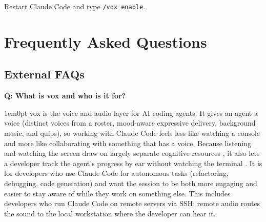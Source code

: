 \documentclass[11pt,letterpaper]{article}
\newcounter{faqnum}
\newenvironment{faqpair}[1]{%
  \needspace{4\baselineskip}%
  \vspace{0.5em}%
  \refstepcounter{faqnum}%
  \noindent\textbf{\color{SectionBlue}Q\thefaqnum: #1}\par\nopagebreak[4]%
  \vspace{0.2em}%
  \begin{adjustwidth}{1em}{0pt}%
  \setlength{\parindent}{0pt}%
}{%
  \end{adjustwidth}%
  \vspace{0.5em}%
}
\begin{document}
Restart Claude Code and type \texttt{/vox enable}.

\newpage


\section*{Frequently Asked Questions}


\subsection*{External FAQs}

\begin{faqpair}{What is vox and who is it for?}\label{faq:what}
  vox is the voice and audio layer for AI coding agents. It gives an
  agent a voice (distinct voices from a roster, mood-aware expressive
  delivery, background music, and quips), so working with Claude Code feels
  less like watching a console and more like collaborating with something that
  has a voice. Because listening and watching the screen draw on largely
  separate cognitive resources
  \cite{baddeleyhitch1974workingmemory,baddeley2000episodicbuffer}, it also
  lets a developer track the agent's progress by ear without watching the
  terminal \cite{springer2016audiovisual,mccrickardchewar2003attuning}.
  It is for
  developers who use Claude Code for autonomous tasks (refactoring,
  debugging, code generation) and want the session to be both more engaging
  and easier to stay aware of while they work on something else. This includes
  developers who run Claude Code on remote servers via SSH: remote audio
  routes the sound to the local workstation where the developer can hear it.
\end{faqpair}
\end{document}

